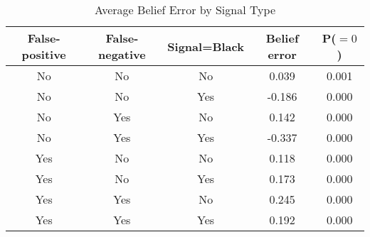 \begin{table}[H]\centering \caption{Average Belief Error by Signal Type} \begin{tabular}{ccccc} \hline \hline
\textbf{False-positive}&\textbf{False-negative}&\textbf{Signal=Black}&\textbf{Belief error}& \textbf{P($=0$)}\\ \hline
No&No&No&0.039&0.001\\
No&No&Yes&-0.186&0.000\\
No&Yes&No&0.142&0.000\\
No&Yes&Yes&-0.337&0.000\\
Yes&No&No&0.118&0.000\\
Yes&No&Yes&0.173&0.000\\
Yes&Yes&No&0.245&0.000\\
Yes&Yes&Yes&0.192&0.000\\
\hline \end{tabular} \end{table}
